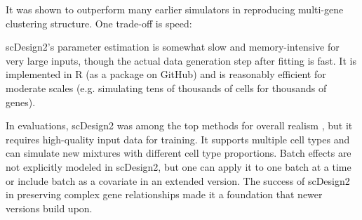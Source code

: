 \documentclass{article}
\begin{document}
It was shown to outperform many earlier simulators in reproducing multi-gene clustering structure. One trade-off is speed:

scDesign2's parameter estimation is somewhat slow and memory-intensive for very large inputs, though the actual data generation step after fitting is fast. It is implemented in R (as a package on GitHub) and is reasonably efficient for moderate scales (e.g. simulating tens of thousands of cells for thousands of genes).

In evaluations, scDesign2 was among the top methods for overall realism \cite{crowell2023shaky}, but it requires high-quality input data for training. It supports multiple cell types and can simulate new mixtures with different cell type proportions. Batch effects are not explicitly modeled in scDesign2, but one can apply it to one batch at a time or include batch as a covariate in an extended version. The success of scDesign2 in preserving complex gene relationships made it a foundation that newer versions build upon.
\end{document}
